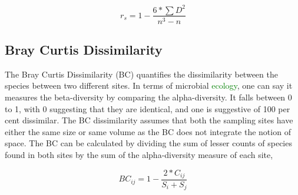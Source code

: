 $$r_{s} = 1 - \frac{6 * \sum D^{2}}{n^{3} - n}$$

\subsection{Bray Curtis Dissimilarity}
The Bray Curtis Dissimilarity (BC) quantifies the dissimilarity between the species between two different sites. In terms of microbial \textcolor{green}{ecology}, one can say it measures the beta-diversity by comparing the alpha-diversity. It falls between 0 to 1, with 0 suggesting that they are identical, and one is suggestive of 100 per cent dissimilar. The BC dissimilarity assumes that both the sampling sites have either the same size or same volume as the BC does not integrate the notion of space. The BC can be calculated by dividing the sum of lesser counts of species found in both sites by the sum of the alpha-diversity measure of each site,

$$BC_{ij} = 1 - \frac{2 * C_{ij}}{S_{i} + S_{j}}$$
